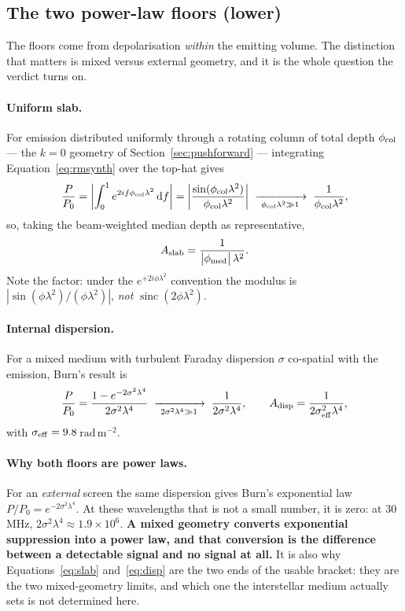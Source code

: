 \documentclass[11pt]{article}
\newcommand{\rmu}{\ensuremath{\mathrm{rad\,m^{-2}}}}
\newcommand{\lamsq}{\ensuremath{\lambda^{2}}}
\begin{document}
\subsection{The two power-law floors (lower)}

The floors come from depolarisation \emph{within} the emitting volume.
The distinction that matters is mixed versus external geometry, and it is
the whole question the verdict turns on.

\paragraph{Uniform slab.} For emission distributed uniformly through a
rotating column of total depth $\phi_{\rm col}$ --- the $k=0$ geometry of
Section~\ref{sec:pushforward} --- integrating
Equation~\eqref{eq:rmsynth} over the top-hat gives
\begin{equation}
  \frac{P}{P_0} =
  \left|\int_0^1 e^{2if\phi_{\rm col}\lamsq}\,\mathrm df\right|
  = \left|\frac{\sin(\phi_{\rm col}\lamsq)}{\phi_{\rm col}\lamsq}\right|
  \;\xrightarrow[\ \phi_{\rm col}\lamsq \gg 1\ ]{}\;
  \frac{1}{\phi_{\rm col}\lamsq},
\end{equation}
so, taking the beam-weighted median depth as representative,
\begin{equation}
  A_{\rm slab} = \frac{1}{\bigl|\phi_{\rm med}\bigr|\,\lamsq} .
  \label{eq:slab}
\end{equation}
Note the factor: under the $e^{+2i\phi\lamsq}$ convention the modulus is
$|\sin(\phi\lamsq)/(\phi\lamsq)|$, \emph{not}
$\operatorname{sinc}(2\phi\lamsq)$.

\paragraph{Internal dispersion.} For a mixed medium with turbulent
Faraday dispersion $\sigma$ co-spatial with the emission, Burn's result
\citep{burn1966,sokoloff1998} is
\begin{equation}
  \frac{P}{P_0} = \frac{1 - e^{-2\sigma^{2}\lambda^{4}}}
  {2\sigma^{2}\lambda^{4}}
  \;\xrightarrow[\ 2\sigma^2\lambda^4 \gg 1\ ]{}\;
  \frac{1}{2\sigma^{2}\lambda^{4}},
  \qquad
  A_{\rm disp} = \frac{1}{2\sigma_{\rm eff}^{2}\lambda^{4}},
  \label{eq:disp}
\end{equation}
with $\sigma_{\rm eff} = 9.8$\,\rmu.

\paragraph{Why both floors are power laws.} For an \emph{external}
screen the same dispersion gives Burn's exponential law
$P/P_0 = e^{-2\sigma^2\lambda^4}$. At these wavelengths that is not a
small number, it is zero: at 30\,MHz, $2\sigma^2\lambda^4 \approx
1.9\times10^{6}$. \textbf{A mixed geometry converts exponential
suppression into a power law, and that conversion is the difference
between a detectable signal and no signal at all.} It is also why
Equations~\eqref{eq:slab} and~\eqref{eq:disp} are the two ends of the
usable bracket: they are the two mixed-geometry limits, and which one the
interstellar medium actually sets is not determined here.
\end{document}
